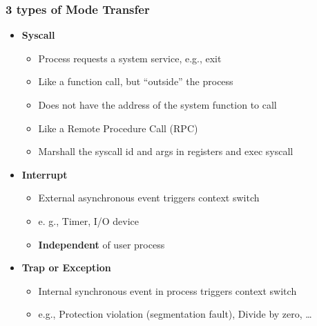 \subsubsection{3 types of Mode Transfer}
\begin{itemize}
    \item \textbf{Syscall}
    \begin{itemize}
        \item Process requests a system service, e.g., exit
        \item Like a function call, but ``outside'' the process
        \item Does not have the address of the system function to call
        \item Like a Remote Procedure Call (RPC)
        \item Marshall the syscall id and args in registers and exec syscall
    \end{itemize}
    \item \textbf{Interrupt}
    \begin{itemize}
        \item External asynchronous event triggers context switch
        \item e. g., Timer, I/O device
        \item \textbf{Independent} of user process
    \end{itemize}
    \item \textbf{Trap or Exception}
    \begin{itemize}
        \item Internal synchronous event in process triggers context switch
        \item e.g., Protection violation (segmentation fault), Divide by zero, \dots
    \end{itemize}
\end{itemize}
